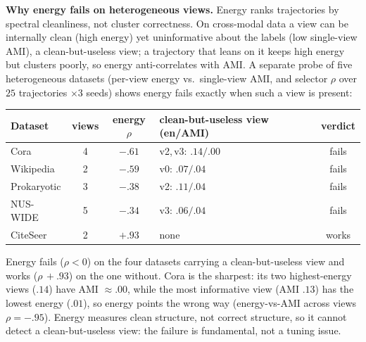 \medskip
\noindent\textbf{Why energy fails on heterogeneous views.} Energy ranks trajectories by spectral
cleanliness, not cluster correctness. On cross-modal data a view can be internally clean
(high energy) yet uninformative about the labels (low single-view AMI), a clean-but-useless view;
a trajectory that leans on it keeps high energy but clusters poorly, so energy anti-correlates with AMI.
A separate probe of five heterogeneous datasets (per-view energy vs.\ single-view AMI, and selector
$\rho$ over $25$ trajectories $\times3$ seeds) shows energy fails exactly when such a view is
present:

\begin{center}\footnotesize
\begin{tabular}{@{}l c c l c@{}}
\toprule
Dataset & views & energy $\rho$ & clean-but-useless view (en/AMI) & verdict\\
\midrule
Cora        & 4 & $-.61$ & v2,\,v3: $.14/.00$ & fails\\
Wikipedia   & 2 & $-.59$ & v0: $.07/.04$      & fails\\
Prokaryotic & 3 & $-.38$ & v2: $.11/.04$      & fails\\
NUS-WIDE    & 5 & $-.34$ & v3: $.06/.04$      & fails\\
CiteSeer    & 2 & $+.93$ & none               & works\\
\bottomrule
\end{tabular}
\end{center}

\noindent Energy fails ($\rho<0$) on the four datasets carrying a clean-but-useless view and works
($\rho\,{+}.93$) on the one without. Cora is the sharpest: its two highest-energy views ($.14$) have AMI
${\approx}.00$, while the most informative view (AMI $.13$) has the lowest energy ($.01$), so
energy points the wrong way (energy-vs-AMI across views $\rho={-}.95$). Energy measures clean structure,
not correct structure, so it cannot detect a clean-but-useless view: the failure is fundamental, not a
tuning issue.

